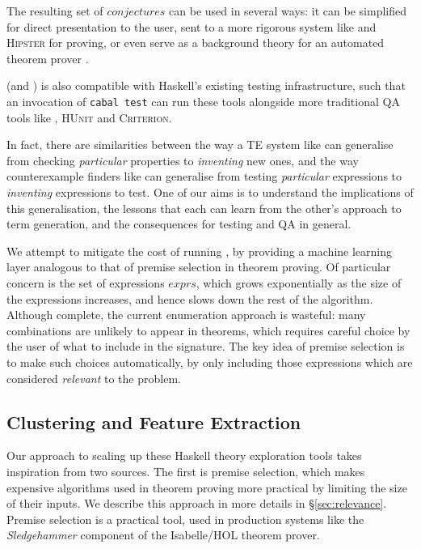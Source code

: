 The resulting set of $conjectures$ can be used in several ways: it can be simplified for direct presentation to the user, sent to a more rigorous system like \hspec{} and \textsc{Hipster} for proving, or even serve as a background theory for an automated theorem prover \citep{claessen2013automating}.

\qspec{} (and \hspec{}) is also compatible with Haskell's existing testing infrastructure, such that an invocation of \texttt{cabal test} can run these tools alongside more traditional QA tools like \qcheck{}, \textsc{HUnit} and \textsc{Criterion}.

In fact, there are similarities between the way a TE system like \qspec{} can generalise from checking \emph{particular} properties to \emph{inventing} new ones, and the way counterexample finders like \qcheck{} can generalise from testing \emph{particular} expressions to \emph{inventing} expressions to test. One of our aims is to understand the implications of this generalisation, the lessons that each can learn from the other's approach to term generation, and the consequences for testing and QA in general.

We attempt to mitigate the cost of running \qspec{}, by providing a machine learning layer analogous to that of premise selection in theorem proving. Of particular concern is the set of expressions $exprs$, which grows exponentially as the size of the expressions increases, and hence slows down the rest of the algorithm. Although complete, the current enumeration approach is wasteful: many combinations are unlikely to appear in theorems, which requires careful choice by the user of what to include in the signature. The key idea of premise selection is to make such choices automatically, by only including those expressions which are considered \emph{relevant} to the problem.

\iffalse TODO: Not immediately clear how the problem of reducing the set of expressions relates to premise selection \fi
\iffalse TODO: This detailed comparison with premise selection is opaque without defining/explaining what premise selection is \fi

\subsection{Clustering and Feature Extraction}
\label{sec:featureextraction}

Our approach to scaling up these Haskell theory exploration tools takes inspiration from two sources. The first is premise selection, which makes expensive algorithms used in theorem proving more practical by limiting the size of their inputs. We describe this approach in more details in \S \ref{sec:relevance}. Premise selection is a practical tool, used in production systems like the \emph{Sledgehammer} component of the Isabelle/HOL theorem prover.

